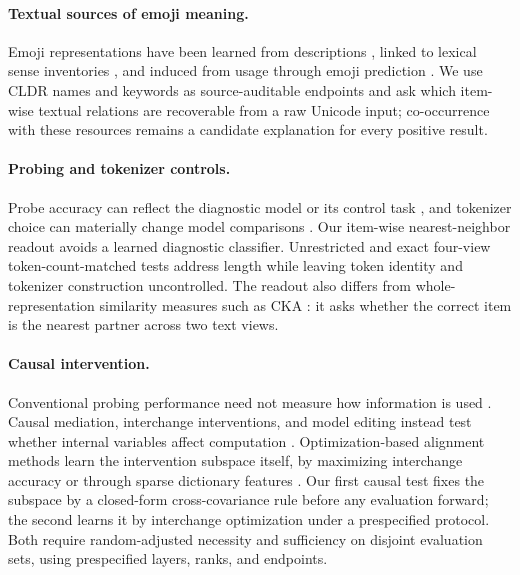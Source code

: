 \documentclass{article}
\begin{document}
\paragraph{Textual sources of emoji meaning.}
Emoji representations have been learned from descriptions
\citep{eisner2016emoji2vec}, linked to lexical sense inventories
\citep{wijeratne2017emojinet}, and induced from usage through emoji prediction
\citep{felbo2017deepmoji,barbieri2018interpretable}. We use CLDR names and
keywords \citep{unicode2026cldr} as source-auditable endpoints and ask which
item-wise textual relations are recoverable from a raw Unicode input;
co-occurrence with these resources remains a candidate explanation for every
positive result.

\paragraph{Probing and tokenizer controls.}
Probe accuracy can reflect the diagnostic model or its control task
\citep{hewitt2019designing}, and tokenizer choice can materially change model
comparisons \citep{rust2021tokenizer}. Our item-wise nearest-neighbor readout
avoids a learned diagnostic classifier. Unrestricted and exact four-view
token-count-matched tests address length while leaving token identity and
tokenizer construction uncontrolled. The readout also differs from
whole-representation similarity measures such as CKA
\citep{kornblith2019similarity}: it asks whether the correct item is the
nearest partner across two text views.

\paragraph{Causal intervention.}
Conventional probing performance need not measure how information is used
\citep{elazar2021amnesic}. Causal mediation, interchange interventions, and
model editing instead test whether internal variables affect computation
\citep{vig2020causal,geiger2021causal,meng2022rome}. Optimization-based
alignment methods learn the intervention subspace itself, by maximizing
interchange accuracy \citep{geiger2024das,wu2023boundless} or through sparse
dictionary features \citep{bricken2023monosemanticity,cunningham2024sparse}.
Our first causal test fixes the subspace by a closed-form cross-covariance
rule before any evaluation forward; the second learns it by interchange
optimization under a prespecified protocol. Both require random-adjusted necessity
and sufficiency on disjoint evaluation sets, using prespecified layers,
ranks, and endpoints.
\end{document}
